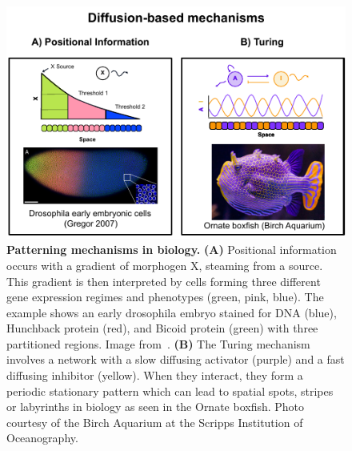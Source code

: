 \begin{figure}[h]
    \centering
    \includegraphics[width=1\textwidth]{chapters/Introduction/diffusion_based_mechanisms}
    \caption{\textbf{Patterning mechanisms in biology.} \textbf{(A)} Positional information occurs with a gradient of morphogen X, steaming from a source. This gradient is then interpreted by cells forming three different gene expression regimes and phenotypes (green, pink, blue).
    The example shows an early drosophila embryo stained for DNA (blue), Hunchback protein (red), and Bicoid protein (green) with three partitioned regions. Image from~\cite{gregor2007probing}. \textbf{(B)} The Turing mechanism involves a network with a slow diffusing activator (purple) and a fast diffusing inhibitor (yellow). When they interact, they form a periodic stationary pattern which can lead to spatial spots, stripes or labyrinths in biology as seen in the Ornate boxfish. Photo courtesy of the Birch Aquarium at the Scripps Institution of Oceanography.}
    \label{fig:diffusion_based_mechanisms}
\end{figure}



